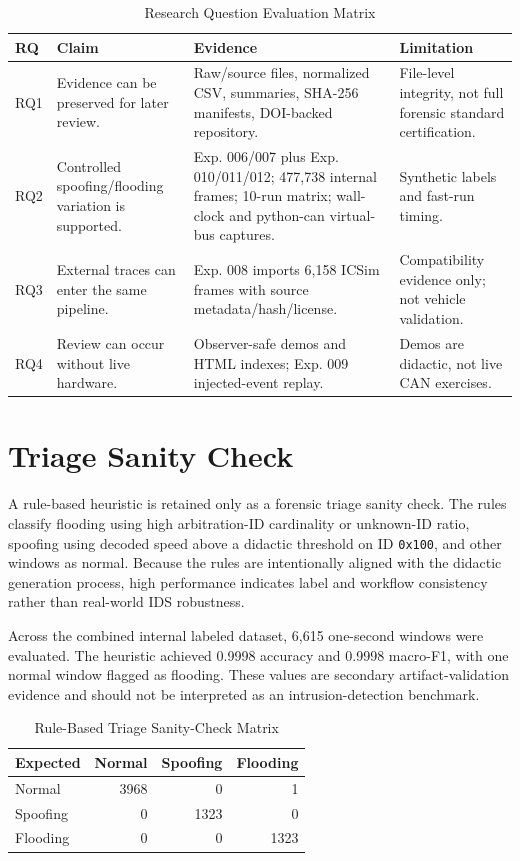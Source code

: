 \documentclass[conference]{IEEEtran}
\begin{document}
\begin{table}[t]
\caption{Research Question Evaluation Matrix}
\label{tab:rq}
\centering
\footnotesize
\begin{tabular}{p{}p{}p{}p{}}
\toprule
RQ & Claim & Evidence & Limitation \\
\midrule
RQ1 & Evidence can be preserved for later review. & Raw/source files, normalized CSV, summaries, SHA-256 manifests, DOI-backed repository. & File-level integrity, not full forensic standard certification. \\
RQ2 & Controlled spoofing/flooding variation is supported. & Exp. 006/007 plus Exp. 010/011/012; 477,738 internal frames; 10-run matrix; wall-clock and python-can virtual-bus captures. & Synthetic labels and fast-run timing. \\
RQ3 & External traces can enter the same pipeline. & Exp. 008 imports 6,158 ICSim frames with source metadata/hash/license. & Compatibility evidence only; not vehicle validation. \\
RQ4 & Review can occur without live hardware. & Observer-safe demos and HTML indexes; Exp. 009 injected-event replay. & Demos are didactic, not live CAN exercises. \\
\bottomrule
\end{tabular}
\end{table}

\section{Triage Sanity Check}
A rule-based heuristic is retained only as a forensic triage sanity check. The rules classify flooding using high arbitration-ID cardinality or unknown-ID ratio, spoofing using decoded speed above a didactic threshold on ID \texttt{0x100}, and other windows as normal. Because the rules are intentionally aligned with the didactic generation process, high performance indicates label and workflow consistency rather than real-world IDS robustness.

Across the combined internal labeled dataset, 6,615 one-second windows were evaluated. The heuristic achieved 0.9998 accuracy and 0.9998 macro-F1, with one normal window flagged as flooding. These values are secondary artifact-validation evidence and should not be interpreted as an intrusion-detection benchmark.

\begin{table}[t]
\caption{Rule-Based Triage Sanity-Check Matrix}
\label{tab:triage}
\centering
\footnotesize
\begin{tabular}{lrrr}
\toprule
Expected & Normal & Spoofing & Flooding \\
\midrule
Normal & 3968 & 0 & 1 \\
Spoofing & 0 & 1323 & 0 \\
Flooding & 0 & 0 & 1323 \\
\bottomrule
\end{tabular}
\end{table}
\end{document}
